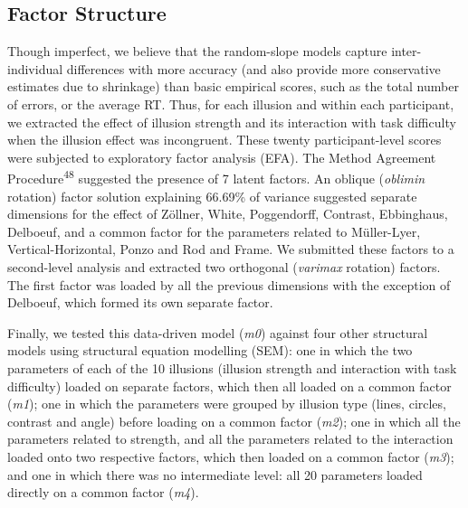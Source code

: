 \documentclass[
  man,floatsintext]{apa6}
\begin{document}
\hypertarget{factor-structure}{%
\subsection{Factor Structure}\label{factor-structure}}

Though imperfect, we believe that the random-slope models capture inter-individual differences with more accuracy (and also provide more conservative estimates due to shrinkage) than basic empirical scores, such as the total number of errors, or the average RT. Thus, for each illusion and within each participant, we extracted the effect of illusion strength and its interaction with task difficulty when the illusion effect was incongruent. These twenty participant-level scores were subjected to exploratory factor analysis (EFA). The Method Agreement Procedure\textsuperscript{48} suggested the presence of 7 latent factors. An oblique (\emph{oblimin} rotation) factor solution explaining 66.69\% of variance suggested separate dimensions for the effect of Zöllner, White, Poggendorff, Contrast, Ebbinghaus, Delboeuf, and a common factor for the parameters related to Müller-Lyer, Vertical-Horizontal, Ponzo and Rod and Frame. We submitted these factors to a second-level analysis and extracted two orthogonal (\emph{varimax} rotation) factors. The first factor was loaded by all the previous dimensions with the exception of Delboeuf, which formed its own separate factor.

Finally, we tested this data-driven model (\emph{m0}) against four other structural models using structural equation modelling (SEM): one in which the two parameters of each of the 10 illusions (illusion strength and interaction with task difficulty) loaded on separate factors, which then all loaded on a common factor (\emph{m1}); one in which the parameters were grouped by illusion type (lines, circles, contrast and angle) before loading on a common factor (\emph{m2}); one in which all the parameters related to strength, and all the parameters related to the interaction loaded onto two respective factors, which then loaded on a common factor (\emph{m3}); and one in which there was no intermediate level: all 20 parameters loaded directly on a common factor (\emph{m4}).
\end{document}
